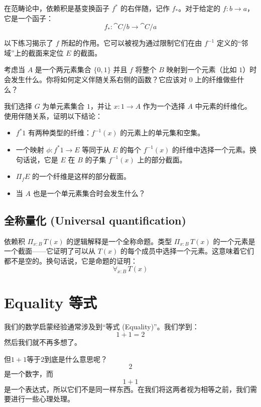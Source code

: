 \documentclass[DaoFP]{subfiles}
\begin{document}
  在范畴论中，依赖积是基变换函子 $f^*$ 的右伴随，记作 $f_*$。对于给定的 $f \colon b \to a$，它是一个函子：
  \[ f_* \colon \cat C/b \to \cat C/a \]

  以下练习揭示了 $f$ 所起的作用。它可以被视为通过限制它们在由 $f^{-1}$ 定义的“邻域”上的截面来定位 $E$ 的截面。

  \begin{exercise}
   考虑当 $A$ 是一个两元素集合 $\{0, 1\}$ 并且 $f$ 将整个 $B$ 映射到一个元素（比如 $1$）时会发生什么。你将如何定义伴随关系右侧的函数？它应该对 $0$ 上的纤维做些什么？
  \end{exercise}

  \begin{exercise}
   我们选择 $G$ 为单元素集合 $1$，并让 $x \colon 1 \to A$ 作为一个选择 $A$ 中元素的纤维化。使用伴随关系，证明以下结论：
   \begin{itemize}
    \item $f^* 1$ 有两种类型的纤维：$f^{-1} (x)$ 的元素上的单元集和空集。
    \item 一个映射 $\phi \colon f^* 1 \to E$ 等同于从 $E$ 的每个 $f^{-1}(x)$ 的纤维中选择一个元素。换句话说，它是 $E$ 在 $B$ 的子集 $f^{-1}(x)$ 上的部分截面。
    \item $\Pi_f E$ 的一个纤维是这样的部分截面。
    \item 当 $A$ 也是一个单元素集合时会发生什么？
   \end{itemize}
  \end{exercise}



  \subsection{全称量化 (Universal quantification)}

  依赖积 $\Pi_{x : B} \, T(x)$ 的逻辑解释是一个全称命题。类型 $\Pi_{x : B} \, T(x)$ 的一个元素是一个截面——它证明了可以从 $T(x)$ 的每个成员中选择一个元素。这意味着它们都不是空的。换句话说，它是命题的证明：
  \[ \forall_{x : B}\, T(x) \]

 \section{Equality 等式}

 我们的数学启蒙经验通常涉及到“等式 (Equality)”。我们学到：
 \[1+1=2\]
 然后我们就不再多想了。

 但$1+1$等于$2$到底是什么意思呢？$$2$$是一个数字，而$$1+1$$是一个表达式，所以它们不是同一样东西。在我们将这两者视为相等之前，我们需要进行一些心理处理。
\end{document}
